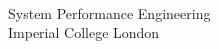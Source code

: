 
\begin{titlepage}


    \begin{flushright}
         \\
        \vspace{4mm}
        \moduletitlefont System Performance Engineering \\
        \vspace{1mm}
        \imperialfont Imperial College London
    \end{flushright}
\end{titlepage}

